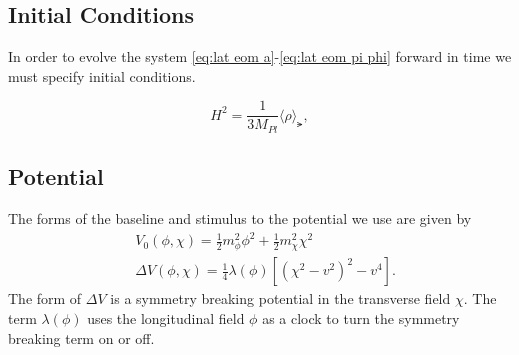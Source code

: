 \subsection{Initial Conditions}
In order to evolve the system \eqref{eq:lat eom a}-\eqref{eq:lat eom pi phi} forward in time we must specify initial conditions.

  
\begin{equation} \label{eq:energy constraint}
  H^2 = \frac{1}{3M_{Pl}}\langle \rho \rangle_\lat,
\end{equation} 


\subsection{Potential}
\Fpotential


The forms of the baseline and stimulus to the potential we use are given by
\begin{align} \label{eq:potential}
  &V_0(\phi,\chi) = \frac{1}{2}m^2_\phi\phi^2 + \frac{1}{2}m^2_\chi\chi^2 \\
  &\Delta V(\phi,\chi) = \frac{1}{4}\lambda(\phi)\left[ (\chi^2-v^2)^2 - v^4 \right].
\end{align}
The form of $\Delta V$ is a symmetry breaking potential in the transverse field $\chi$. The term $\lambda(\phi)$ uses the longitudinal field $\phi$ as a clock to turn the symmetry breaking term on or off.


